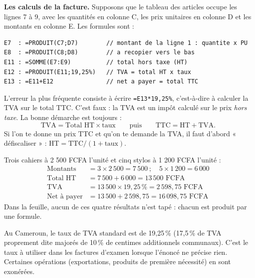 \documentclass[11pt]{article}
\newcommand{\cle}[1]{{\popxbold\color{popdark}#1}}
\begin{document}
\textbf{Les calculs de la facture.} Supposons que le tableau des articles occupe les lignes 7 à 9, avec les quantités en colonne C, les prix unitaires en colonne D et les montants en colonne E. Les formules sont :

\begin{lstlisting}
E7  : =PRODUIT(C7;D7)        // montant de la ligne 1 : quantite x PU
E8  : =PRODUIT(C8;D8)        // a recopier vers le bas
E11 : =SOMME(E7:E9)          // total hors taxe (HT)
E12 : =PRODUIT(E11;19,25%)   // TVA = total HT x taux
E13 : =E11+E12               // net a payer = total TTC
\end{lstlisting}

\begin{attention}
L'erreur la plus fréquente consiste à écrire \texttt{=E13*19,25\%}, c'est-à-dire à calculer la TVA sur le total TTC. C'est faux : la TVA est un impôt calculé sur le prix \emph{hors taxe}. La bonne démarche est toujours :
\[ \text{TVA} = \text{Total HT} \times \text{taux} \qquad\text{puis}\qquad \text{TTC} = \text{HT} + \text{TVA}. \]
Si l'on te donne un prix TTC et qu'on te demande la TVA, il faut d'abord « défiscaliser » : $\text{HT} = \text{TTC} / (1 + \text{taux})$.
\end{attention}

\begin{exemplebox}
Trois cahiers à 2 500 FCFA l'unité et cinq stylos à 1 200 FCFA l'unité :
\begin{align*}
\text{Montants} &= 3 \times 2\,500 = 7\,500 \ ;\quad 5 \times 1\,200 = 6\,000 \\
\text{Total HT} &= 7\,500 + 6\,000 = 13\,500 \text{ FCFA} \\
\text{TVA} &= 13\,500 \times 19{,}25\,\% = 2\,598{,}75 \text{ FCFA} \\
\text{Net \`a payer} &= 13\,500 + 2\,598{,}75 = 16\,098{,}75 \text{ FCFA}
\end{align*}
Dans la feuille, aucun de ces quatre résultats n'est tapé : chacun est produit par une formule.
\end{exemplebox}

\begin{savaistu}
Au Cameroun, le taux de TVA standard est de \cle{19,25\,\%} (17,5\,\% de TVA proprement dite majorés de 10\,\% de centimes additionnels communaux). C'est le taux à utiliser dans les factures d'examen lorsque l'énoncé ne précise rien. Certaines opérations (exportations, produits de première nécessité) en sont exonérées.
\end{savaistu}
\end{document}
